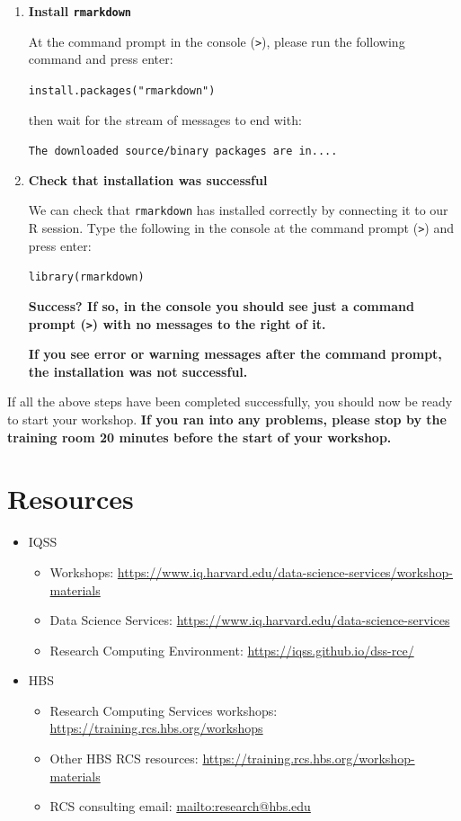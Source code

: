 \documentclass[
]{book}
\providecommand{\tightlist}{%
  \setlength{\itemsep}{0pt}\setlength{\parskip}{0pt}}
\begin{document}
\begin{enumerate}
\def\labelenumi{\arabic{enumi}.}
\item
  \textbf{Install \texttt{rmarkdown}}

  At the command prompt in the console (\texttt{\textgreater{}}), please run the following command and press enter:

  \texttt{install.packages("rmarkdown")}

  then wait for the stream of messages to end with:

  \texttt{The\ downloaded\ source/binary\ packages\ are\ in....}
\item
  \textbf{Check that installation was successful}

  We can check that \texttt{rmarkdown} has installed correctly by connecting it to our R session.
  Type the following in the console at the command prompt (\texttt{\textgreater{}}) and press enter:

  \texttt{library(rmarkdown)}

  \textbf{Success? If so, in the console you should see just a command prompt (\texttt{\textgreater{}}) with no messages to the right of it.}

  \textbf{If you see error or warning messages after the command prompt, the installation was not successful.}
\end{enumerate}

If all the above steps have been completed successfully, you should now
be ready to start your workshop. \textbf{If you ran into any problems, please
stop by the training room 20 minutes before the start of your workshop.}

\hypertarget{resources-1}{%
\section{Resources}\label{resources-1}}

\begin{itemize}
\tightlist
\item
  IQSS

  \begin{itemize}
  \tightlist
  \item
    Workshops: \url{https://www.iq.harvard.edu/data-science-services/workshop-materials}
  \item
    Data Science Services: \url{https://www.iq.harvard.edu/data-science-services}
  \item
    Research Computing Environment: \url{https://iqss.github.io/dss-rce/}
  \end{itemize}
\item
  HBS

  \begin{itemize}
  \tightlist
  \item
    Research Computing Services workshops: \url{https://training.rcs.hbs.org/workshops}
  \item
    Other HBS RCS resources: \url{https://training.rcs.hbs.org/workshop-materials}
  \item
    RCS consulting email: \url{mailto:research@hbs.edu}
  \end{itemize}
\end{itemize}
\end{document}
